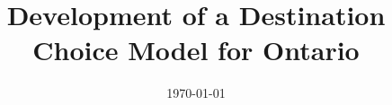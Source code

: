 \documentclass[a4paper, 11pt, oneside]{Thesis}  %
\begin{document}
\frontmatter      %

\title  {Development of a Destination Choice Model for Ontario}
\addresses  {\groupname\\\deptname\\\univname}  %
\date       {\today}
\subject    {}
\keywords   {}

\maketitle


\fancyhead{}  %
\rhead{\thepage}  %
\lhead{}  %

\pagestyle{fancy}  %
\end{document}

